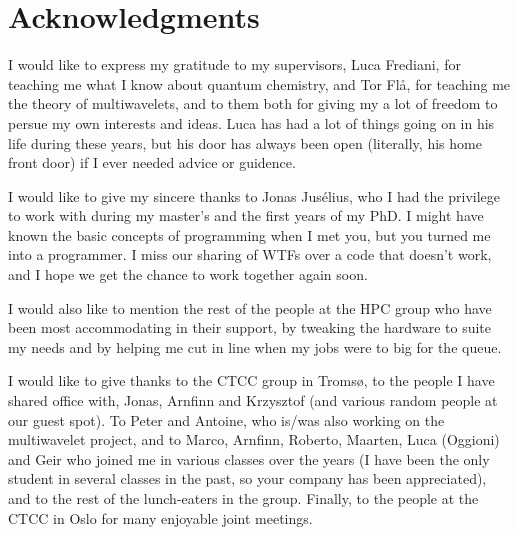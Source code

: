 \chapter*{Acknowledgments}
I would like to express my gratitude to my supervisors, Luca Frediani, for teaching 
me what I know about quantum chemistry, and Tor Fl\aa, for teaching me the theory of
multiwavelets, and to them both for giving my a lot of freedom to persue my own 
interests and ideas. Luca has had a lot of things going on in his life during these 
years, but his door has always been open (literally, his home front door) if I ever 
needed advice or guidence.

I would like to give my sincere thanks to Jonas Jus\'{e}lius, who I had the privilege
to work with during my master's and the first years of my PhD. I might have known the
basic concepts of programming when I met you, but you turned me into a 
programmer. I miss our sharing of WTFs over a code that doesn't work, and I hope 
we get the chance to work together again soon. 

I would also like to mention the rest of the people at the HPC group who have been most 
accommodating in their support, by tweaking the hardware to suite my needs and by 
helping me cut in line when my jobs were to big for the queue.

I would like to give thanks to the CTCC group in Troms\o, to the people I have shared
office with, Jonas, Arnfinn and Krzysztof (and various random people at our guest spot).
To Peter and Antoine, who is/was also working on the multiwavelet project, and to Marco, 
Arnfinn, Roberto, Maarten, Luca (Oggioni) and Geir who joined me in various classes 
over the years (I have been the only student in several classes in the past, so your 
company has been appreciated), and to the rest of the lunch-eaters in the group. 
Finally, to the people at the CTCC in Oslo for many enjoyable joint meetings.

\pagebreak
\ 
\pagebreak
